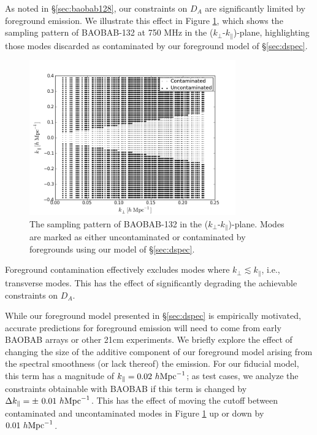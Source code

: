 \documentclass[10pt,iop]{emulateapj}
\begin{document}
As noted in \S\ref{sec:baobab128}, our constraints on $D_A$ are significantly limited by foreground
emission.  We illustrate this effect in Figure \ref{fig:fgloss}, which shows the sampling pattern
of BAOBAB-132 at 750 MHz in the ($k_{\perp}$-$k_{\parallel}$)-plane, highlighting those modes 
discarded as contaminated by our foreground model of \S\ref{sec:dspec}.  
\begin{figure}\centering
\includegraphics[width=3.5in]{fgloss.png}
\caption{The sampling pattern of BAOBAB-132 in the ($k_{\perp}$-$k_{\parallel}$)-plane.  Modes are 
marked as either uncontaminated or 
contaminated by foregrounds using our model of \S\ref{sec:dspec}.
} \label{fig:fgloss}
\end{figure}
Foreground
contamination effectively excludes modes where $k_{\perp} \lesssim k_{\parallel}$, i.e., transverse
modes.  This has the effect of significantly degrading the achievable constraints on $D_A$.

While our foreground model presented in \S\ref{sec:dspec} is empirically motivated, 
accurate predictions for foreground emission
will need to come from early BAOBAB arrays or other 21cm experiments.  We briefly explore the effect
of changing the size of the additive component of our foreground model arising from the
spectral smoothness (or lack thereof) the emission.  For our fiducial model, this term has a
magnitude of $k_{\parallel} = 0.02~h{\rm Mpc}^{-1}$; as test cases, we analyze the constraints
obtainable with BAOBAB if this term is changed by $\Delta k_{\parallel} = 
\pm~0.01~h{\rm Mpc}^{-1}$.  
This has the effect of moving the cutoff between contaminated and uncontaminated modes in Figure
\ref{fig:fgloss} up or down by $0.01~h{\rm Mpc}^{-1}$.
\end{document}
